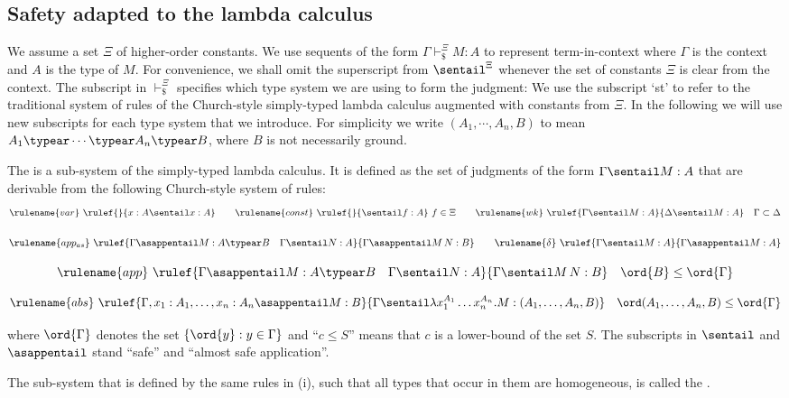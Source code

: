 \subsection*{Safety adapted to the lambda calculus}
We assume a set $\Xi$ of higher-order constants. We use sequents of
the form $\Gamma \vdash_\$^\Xi M : A$ to represent term-in-context
where $\Gamma$ is the context and $A$ is the type of $M$. For
convenience, we shall omit the superscript from $\sentail^\Xi$
whenever the set of constants $\Xi$ is clear from the context. The
subscript in $\vdash_\$^\Xi$ specifies which type system we are
using to form the judgment: We use the subscript `st' to refer to
the traditional system of rules of the Church-style simply-typed
lambda calculus augmented with constants from $\Xi$. In the
following we will use new subscripts for each type system that we
introduce. For simplicity we write $(A_1, \cdots, A_n, B)$ to mean
$A_1 \typear \cdots \typear A_n \typear B$, where $B$ is not
necessarily ground.

\begin{definition}\rm
\label{def:safelambda}
\begin{inparaenum}[(i)]
\item The  is a sub-system of the
  simply-typed lambda calculus. It is defined as the set of judgments of the form $\Gamma \sentail M : A$ that are derivable from the following Church-style system of rules:
$$ \rulename{var} \ \rulef{}{x : A\sentail x : A} \qquad
\rulename{const} \ \rulef{}{\sentail f : A}~f \in \Xi \qquad
\rulename{wk} \ \rulef{\Gamma \sentail M : A}{\Delta \sentail M : A} \quad
\Gamma \subset \Delta$$

$$ \rulename{app_{as}} \ \rulef{\Gamma \asappentail M : A\typear B
\quad \Gamma \sentail N : A} {\Gamma \asappentail M\, N : B}
\qquad
\rulename{\delta} \ \rulef{\Gamma \sentail M : A}{\Gamma \asappentail M : A}
$$

$$ \rulename{app} \ \rulef{\Gamma \asappentail M : A\typear B
\quad \Gamma \sentail N : A} {\Gamma \sentail M\, N : B} \quad \ord{B} \leq
\ord{\Gamma}$$

$$ \rulename{abs} \ \rulef{\Gamma, x_1 : A_1, \ldots, x_n : A_n
  \asappentail M : B} {\Gamma \sentail \lambda x_1^{A_1} \ldots x_n^{A_n} . M :
  (A_1, \ldots ,A_n,B)} \quad \ord(A_1, \ldots ,A_n,B) \leq
\ord{\Gamma}$$
\smallskip

\noindent where $\ord{\Gamma}$ denotes the set $\{ \ord{y} : y \in
\Gamma \}$ and ``$c \leq S$'' means that $c$ is a lower-bound of the
set $S$. The subscripts in $\sentail$ and $\asappentail$ stand
``safe'' and ``almost safe application''.

\noindent \item The sub-system that is defined by the same rules in
(i), such that all types that occur in them are homogeneous, is called
the .
\end{inparaenum}
\end{definition}


